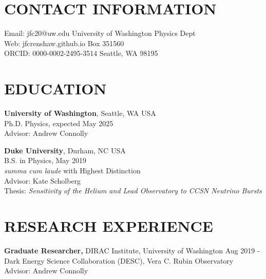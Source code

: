 \documentclass[margin]{res}
\begin{document}

\begin{resume}

\section{\normalfont CONTACT INFORMATION}
{Email: jfc20@uw.edu            \hfill University of Washington Physics Dept \\
Web: jfcrenshaw.github.io       \hfill Box 351560 \\
ORCID: 0000-0002-2495-3514      \hfill Seattle, WA 98195}

\section{\normalfont EDUCATION}

\textbf{University of Washington}, Seattle, WA USA\\
Ph.D. Physics, expected May 2025\\
Advisor: Andrew Connolly

\textbf{Duke University}, Durham, NC USA \\
B.S. in Physics, May 2019\\
\textit{summa cum laude} with Highest Distinction \\
Advisor: Kate Scholberg \\
Thesis: \textit{Sensitivity of the Helium and Lead Observatory to CCSN Neutrino Bursts}

\section{\normalfont RESEARCH EXPERIENCE}

\textbf{Graduate Researcher,} DIRAC Institute, University of Washington \hfill Aug 2019 - \\
Dark Energy Science Collaboration (DESC), Vera C. Rubin Observatory \\
Advisor: Andrew Connolly


\end{resume}
\end{document}
